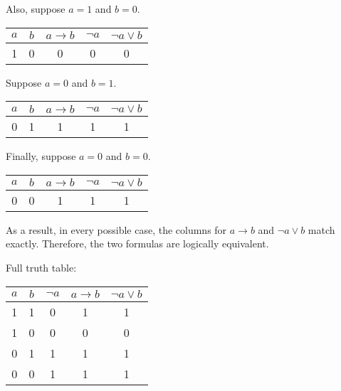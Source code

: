 \documentclass[12pt,a4paper,openany]{article}
\begin{document}
Also, suppose $a = 1$ and $b = 0$.

\begin{center}
\begin{tabular}{|c|c|c|c|c|}
\hline
$a$ & $b$ & $a \to b$ & $\neg a$ & $\neg a \lor b$ \\
\hline
\textcolor{truecolor}{1} & \textcolor{falsecolor}{0} & \textcolor{falsecolor}{0} & \textcolor{falsecolor}{0} & \textcolor{falsecolor}{0} \\
\hline
\end{tabular}
\end{center}

Suppose $a = 0$ and $b = 1$.

\begin{center}
\begin{tabular}{|c|c|c|c|c|}
\hline
$a$ & $b$ & $a \to b$ & $\neg a$ & $\neg a \lor b$ \\
\hline
\textcolor{falsecolor}{0} & \textcolor{truecolor}{1} & \textcolor{truecolor}{1} & \textcolor{truecolor}{1} & \textcolor{truecolor}{1} \\
\hline
\end{tabular}
\end{center}

Finally, suppose $a = 0$ and $b = 0$.

\begin{center}
\begin{tabular}{|c|c|c|c|c|}
\hline
$a$ & $b$ & $a \to b$ & $\neg a$ & $\neg a \lor b$ \\
\hline
\textcolor{falsecolor}{0} & \textcolor{falsecolor}{0} & \textcolor{truecolor}{1} & \textcolor{truecolor}{1} & \textcolor{truecolor}{1} \\
\hline
\end{tabular}
\end{center}

As a result, in every possible case, the columns for $a \to b$ and $\neg a \lor b$ match exactly. Therefore, the two formulas are logically equivalent.

Full truth table:

\begin{center}
\begin{tabular}{|c|c|c|c|c|}
\hline
$a$ & $b$ & $\neg a$ & $a \to b$ & $\neg a \lor b$ \\
\hline
\textcolor{truecolor}{1} & \textcolor{truecolor}{1} & \textcolor{falsecolor}{0} & \textcolor{truecolor}{1} & \textcolor{truecolor}{1} \\
\textcolor{truecolor}{1} & \textcolor{falsecolor}{0} & \textcolor{falsecolor}{0} & \textcolor{falsecolor}{0} & \textcolor{falsecolor}{0} \\
\textcolor{falsecolor}{0} & \textcolor{truecolor}{1} & \textcolor{truecolor}{1} & \textcolor{truecolor}{1} & \textcolor{truecolor}{1} \\
\textcolor{falsecolor}{0} & \textcolor{falsecolor}{0} & \textcolor{truecolor}{1} & \textcolor{truecolor}{1} & \textcolor{truecolor}{1} \\
\hline
\end{tabular}
\end{center}
\end{document}
